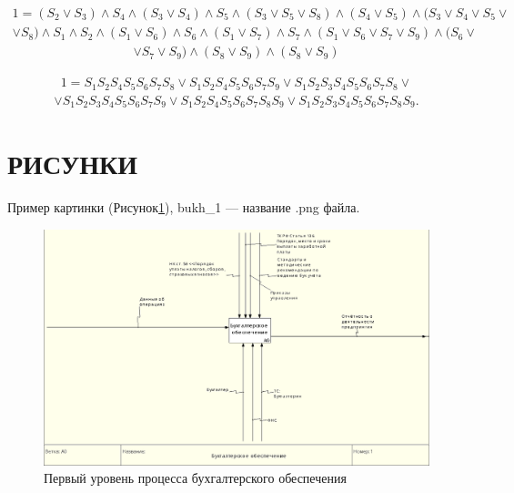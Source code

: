 \documentclass[14pt, a4paper]{extarticle}
\begin{document}
\begin{center}
\onehalfspacing
\vspace{-2em}
\begin{align}
1 = (S_{2} \vee S_{3}) \wedge S_{4} \wedge (S_{3} \vee S_{4}) \wedge S_{5} \wedge (S_{3} \vee S_{5} \vee S_{8}) \wedge (S_{4} \vee S_{5}) \wedge (S_3 \vee S_4 \vee S_5 \vee \nonumber
\end{align}
\vspace{-4em}
\begin{align}
\vee S_8) \wedge S_1 \wedge S_2 \wedge (S_1 \vee S_6) \wedge S_6 \wedge (S_1 \vee S_7) \wedge S_7 \wedge (S_1 \vee S_6 \vee S_7 \vee S_9) \wedge (S_6 \vee \nonumber
\end{align}
\vspace{-4em}
\begin{align}
\vee S_7 \vee S_9) \wedge (S_8 \vee S_9) \wedge (S_8 \vee S_9) \nonumber
\end{align}
\end{center}
\begin{center}
\onehalfspacing
\vspace{-2em}
\begin{align}
1 = S_1S_2S_4S_5S_6S_7S_8 \vee S_1S_2S_4S_5S_6S_7S_9 \vee S_1S_2S_3S_4S_5S_6S_7S_8 \vee \nonumber
\end{align}
\vspace{-4em}
\begin{align}
 \vee S_1S_2S_3S_4S_5S_6S_7S_9 \vee S_1S_2S_4S_5S_6S_7S_8S_9 \vee S_1S_2S_3S_4S_5S_6S_7S_8S_9. \label{func:patrick}
\end{align}
\end{center}

\section{РИСУНКИ}

Пример картинки (Рисунок\;\ref{fig:bukh1}), bukh\_1 --- название .png файла. 

\begin{figure}[H]
\centering
\includegraphics[scale=0.45]{bukh_1}
\caption{Первый уровень процесса бухгалтерского обеспечения\label{fig:bukh1}}
\end{figure}
\end{document}
